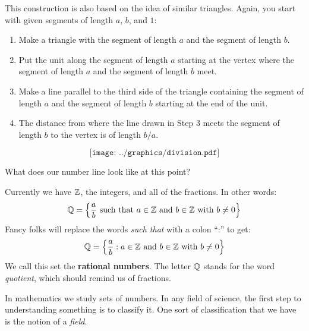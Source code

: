 \begin{construction}[Division] 
This construction is also based on the idea of similar triangles.
Again, you start with given segments of length $a$, $b$, and $1$:
\begin{enumerate}
\item Make a triangle with  the segment of length $a$ and the segment of length $b$.
\item Put the unit along the segment of length $a$ starting at the vertex where the segment of length $a$ and the segment of length $b$ meet.
\item Make a line parallel to the third side of the triangle containing the segment of length $a$ and the segment of length $b$ starting at the end of the unit.
\item The distance from where the line drawn in Step $3$ meets the segment of length $b$ to the vertex is of length $b/a$.
\end{enumerate}
\[
\texttt{[image: ../graphics/division.pdf]}
\]
\end{construction}
 
\begin{question}
What does our number line look like at this point?
\end{question}
 

Currently we have $\mathbb Z$, the integers, and all of the fractions. In other words:
\[
      \Q = \left\{\frac{a}{b}\text{ such that $a\in\Z$ and $b\in\Z$ with $b\ne 0$}\right\}\index{Q@$\Q$}
\]
Fancy folks will replace the words \textit{such that} with a colon ``:'' to get:
\[
 \mathbb Q = \left\{\frac{a}{b}:\text{$a\in\mathbb Z$ and $b\in\mathbb Z$ with $b\ne 0$}\right\}
\]
We call this set the \textbf{rational numbers}.  The letter $\mathbb Q$ stands for the word \textit{quotient}, which should remind us of fractions.


In mathematics we study sets of numbers. In any field of science, the first step to understanding something is to classify it. One sort of classification that we have is the notion of a \textit{field}.


